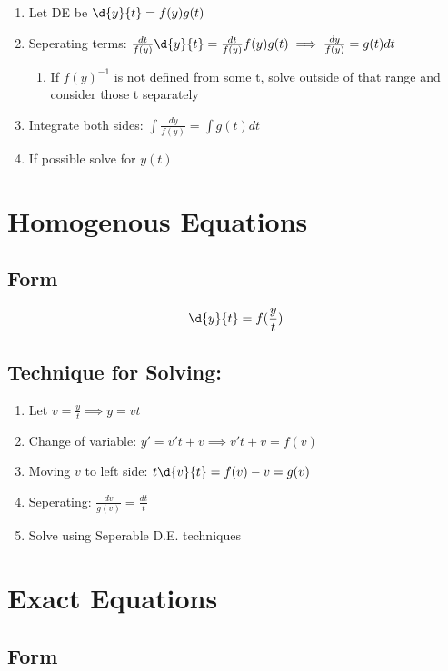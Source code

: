 \documentclass[11pt]{article}
\begin{document}
\begin{enumerate}
\item Let DE be $\d{y}{t}=f(y)g(t)$
\item Seperating terms: $\frac{dt}{f(y)}\d{y}{t}=\frac{dt}{f(y)}f(y)g(t) \implies \frac{dy}{f(y)}=g(t)dt$
\begin{enumerate}
\item If $f(y)^{-1}$ is not defined from some t, solve outside of
          that range and consider those t separately
\end{enumerate}
\item Integrate both sides: $\int \frac{dy}{f(y)}=\int g(t)dt$
\item If possible solve for $y(t)$
\end{enumerate}
\section{Homogenous Equations}
\label{sec-6}
\subsection{Form}
\label{sec-6-1}

   \begin{equation}
   \d{y}{t}=f(\frac{y}{t})
   \end{equation}
\subsection{Technique for Solving:}
\label{sec-6-2}

\begin{enumerate}
\item Let $v=\frac{y}{t} \implies y=vt$
\item Change of variable: $y'=v't+v \implies v't+v=f(v)$
\item Moving $v$ to left side: $t\d{v}{t}=f(v)-v = g(v)$
\item Seperating: $\frac{dv}{g(v)}=\frac{dt}{t}$
\item Solve using Seperable D.E. techniques
\end{enumerate}
\section{Exact Equations}
\label{sec-7}
\subsection{Form}
\label{sec-7-1}
\end{document}
